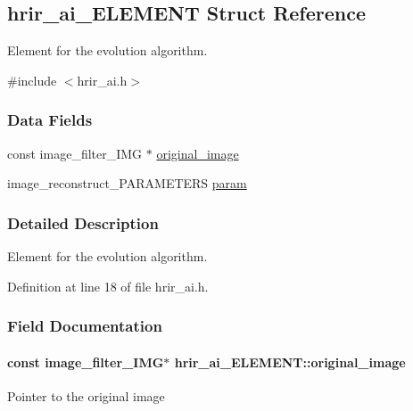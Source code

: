 \hypertarget{a00001}{\subsection{hrir\-\_\-ai\-\_\-\-E\-L\-E\-M\-E\-N\-T Struct Reference}
\label{a00001}
}


Element for the evolution algorithm.  




{\ttfamily \#include $<$hrir\-\_\-ai.\-h$>$}

\subsubsection*{Data Fields}
\begin{DoxyCompactItemize}
\item 
const image\-\_\-filter\-\_\-\-I\-M\-G $\ast$ \hyperlink{a00001_ad0c0f1a46bf293fe30592060db7524d9}{original\-\_\-image}
\item 
image\-\_\-reconstruct\-\_\-\-P\-A\-R\-A\-M\-E\-T\-E\-R\-S \hyperlink{a00001_a2a1fa3a3c0603cdb8f577b070f7b6432}{param}
\end{DoxyCompactItemize}


\subsubsection{Detailed Description}
Element for the evolution algorithm. 

Definition at line 18 of file hrir\-\_\-ai.\-h.



\subsubsection{Field Documentation}
\hypertarget{a00001_ad0c0f1a46bf293fe30592060db7524d9}{
\paragraph[{original\-\_\-image}]{\setlength{\rightskip}{0pt plus 5cm}const image\-\_\-filter\-\_\-\-I\-M\-G$\ast$ hrir\-\_\-ai\-\_\-\-E\-L\-E\-M\-E\-N\-T\-::original\-\_\-image}}\label{a00001_ad0c0f1a46bf293fe30592060db7524d9}
Pointer to the original image 

